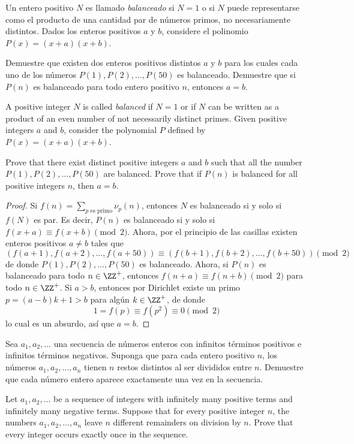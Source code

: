 \begin{probEG}[ISL 2009/N2]
	Un entero positivo $N$ es llamado \emph{balanceado} si $N=1$ o si $N$ puede representarse como el producto de una cantidad par de números primos, no necesariamente distintos. Dados los enteros positivos $a$ y $b$, considere el polinomio $P(x)=(x+a)(x+b)$.
	\begin{enumerate}[(a)]
		\ii Demuestre que existen dos enteros positivos distintos $a$ y $b$ para los cuales cada uno de los números $P(1),P(2),\dots,P(50)$ es balanceado.
		\ii Demuestre que si $P(n)$ es balanceado para todo entero positivo $n$, entonces $a=b$.
	\end{enumerate}
	\begin{hint}
		A positive integer $N$ is called \emph{balanced} if $N=1$ or if $N$ can be written as a product of an even number of not necessarily distinct primes. Given positive integers $a$ and $b$, consider the polynomial $P$ defined by $P(x)=(x+a)(x+b)$.
		\begin{enumerate}[(a)]
			\ii Prove that there exist distinct positive integers $a$ and $b$ such that all the number $P(1),P(2),\dots,P(50)$ are balanced.
			\ii Prove that if $P(n)$ is balanced for all positive integers $n$, then $a=b$.
		\end{enumerate}
	\end{hint}
\end{probEG}

\begin{proof}
	Si $f(n)=\sum_{p\text{ es primo}}\nu_p(n)$, entonces $N$ es balanceado si y solo si $f(N)$ es par. Es decir, $P(n)$ es balanceado si y solo si $f(x+a)\equiv f(x+b)\pmod 2$. Ahora, por el principio de las casillas existen enteros positivos $a\ne b$ tales que
	\[(f(a+1),f(a+2),\dots,f(a+50))\equiv(f(b+1),f(b+2),\dots,f(b+50))\pmod 2\]
	de donde $P(1),P(2),\dots,P(50)$ es balanceado. Ahora, si $P(n)$ es balanceado para todo $n\in\ZZ^+$, entonces $f(n+a)\equiv f(n+b)\pmod 2$ para todo $n\in\ZZ^+$. Si $a>b$, entonces por Dirichlet existe un primo $p=(a-b)k+1>b$ para algún $k\in\ZZ^+$, de donde
	\[1=f(p)\equiv f(p^2)\equiv 0\pmod 2\]
	lo cual es un absurdo, así que $a=b$.
\end{proof}

\begin{probMG}
	Sea $a_1,a_2,\dots$ una secuencia de números enteros con infinitos términos positivos e infinitos términos negativos. Suponga que para cada entero positivo $n$, los números $a_1,a_2,\dots,a_n$ tienen $n$ restos distintos al ser divididos entre $n$. Demuestre que cada número entero aparece exactamente una vez en la secuencia.
	\forum[aops]{281572}
	\begin{hint}
		Let $a_1,a_2,\dots$ be a sequence of integers with infinitely many positive terms and infinitely many negative terms. Suppose that for every positive integer $n$, the numbers $a_1,a_2,\dots,a_n$ leave $n$ different remainders on division by $n$. Prove that every integer occurs exactly once in the sequence.
	\end{hint}
\end{probMG}


